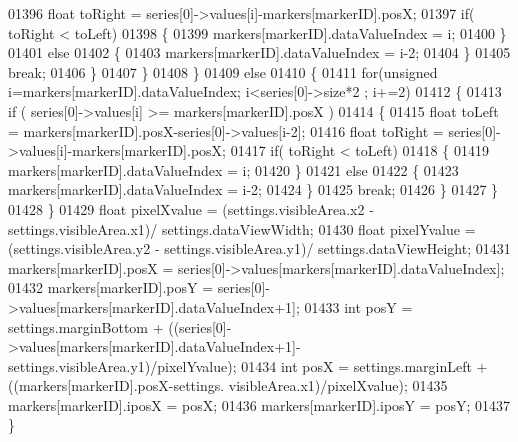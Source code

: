 \begin{DoxyCode}
{{{{{{{{{{{{{{{{01396                     \textcolor{keywordtype}{float} toRight = series[0]->values[i]-markers[markerID].posX;
01397                     \textcolor{keywordflow}{if}( toRight < toLeft)
01398                     \{
01399                         markers[markerID].dataValueIndex = i;
01400                     \}
01401                     \textcolor{keywordflow}{else}
01402                     \{
01403                         markers[markerID].dataValueIndex = i-2;
01404                     \}
01405                     \textcolor{keywordflow}{break};
01406                 \}
01407             \}
01408         \}
01409         \textcolor{keywordflow}{else}
01410         \{
01411             \textcolor{keywordflow}{for}(\textcolor{keywordtype}{unsigned} i=markers[markerID].dataValueIndex; i<series[0]->size*2 ; 
      i+=2)
01412             \{
01413                 \textcolor{keywordflow}{if} ( series[0]->values[i] >= markers[markerID].posX )
01414                 \{
01415                     \textcolor{keywordtype}{float} toLeft = markers[markerID].posX-series[0]->values[i-2];
01416                     \textcolor{keywordtype}{float} toRight = series[0]->values[i]-markers[markerID].posX;
01417                     \textcolor{keywordflow}{if}( toRight < toLeft)
01418                     \{
01419                         markers[markerID].dataValueIndex = i;
01420                     \}
01421                     \textcolor{keywordflow}{else}
01422                     \{
01423                         markers[markerID].dataValueIndex = i-2;
01424                     \}
01425                     \textcolor{keywordflow}{break};
01426                 \}
01427             \}
01428         \}
01429         \textcolor{keywordtype}{float} pixelXvalue = (settings.visibleArea.x2 - settings.visibleArea.x1)/  
      settings.dataViewWidth;
01430         \textcolor{keywordtype}{float} pixelYvalue = (settings.visibleArea.y2 - settings.visibleArea.y1)/  
      settings.dataViewHeight;
01431         markers[markerID].posX = series[0]->values[markers[markerID].dataValueIndex];
01432         markers[markerID].posY = series[0]->values[markers[markerID].dataValueIndex+1];
01433         \textcolor{keywordtype}{int} posY = settings.marginBottom + ((series[0]->values[markers[markerID].dataValueIndex+1]-
      settings.visibleArea.y1)/pixelYvalue);
01434         \textcolor{keywordtype}{int} posX = settings.marginLeft + ((markers[markerID].posX-settings.
      visibleArea.x1)/pixelXvalue);
01435         markers[markerID].iposX = posX;
01436         markers[markerID].iposY = posY;
01437     \}
}}}}}}}}}}}}}}}}
\end{DoxyCode}

